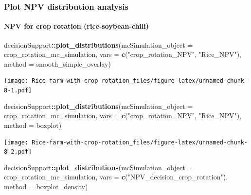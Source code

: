 \documentclass[
]{article}
\newenvironment{Shaded}{\begin{snugshade}}{\end{snugshade}}
\newcommand{\AttributeTok}[1]{\textcolor[rgb]{0.13,0.29,0.53}{#1}}
\newcommand{\FunctionTok}[1]{\textcolor[rgb]{0.13,0.29,0.53}{\textbf{#1}}}
\newcommand{\NormalTok}[1]{#1}
\newcommand{\SpecialCharTok}[1]{\textcolor[rgb]{0.81,0.36,0.00}{\textbf{#1}}}
\newcommand{\StringTok}[1]{\textcolor[rgb]{0.31,0.60,0.02}{#1}}
\begin{document}
\hypertarget{plot-npv-distribution-analysis}{%
\subsubsection{Plot NPV distribution
analysis}\label{plot-npv-distribution-analysis}}

\hypertarget{npv-for-crop-rotation-rice-soybean-chili}{%
\paragraph{NPV for crop rotation
(rice-soybean-chili)}\label{npv-for-crop-rotation-rice-soybean-chili}}

\begin{Shaded}
\begin{Highlighting}[]
\NormalTok{decisionSupport}\SpecialCharTok{::}\FunctionTok{plot\_distributions}\NormalTok{(}\AttributeTok{mcSimulation\_object =}\NormalTok{ crop\_rotation\_mc\_simulation, }
                                    \AttributeTok{vars =} \FunctionTok{c}\NormalTok{(}\StringTok{"crop\_rotation\_NPV"}\NormalTok{, }\StringTok{"Rice\_NPV"}\NormalTok{),}
                                    \AttributeTok{method =} \StringTok{\textquotesingle{}smooth\_simple\_overlay\textquotesingle{}}\NormalTok{)}
\end{Highlighting}
\end{Shaded}

\texttt{[image: Rice-farm-with-crop-rotation\_files/figure-latex/unnamed-chunk-8-1.pdf]}

\begin{Shaded}
\begin{Highlighting}[]
\NormalTok{decisionSupport}\SpecialCharTok{::}\FunctionTok{plot\_distributions}\NormalTok{(}\AttributeTok{mcSimulation\_object =}\NormalTok{ crop\_rotation\_mc\_simulation, }
                                    \AttributeTok{vars =} \FunctionTok{c}\NormalTok{(}\StringTok{"crop\_rotation\_NPV"}\NormalTok{, }\StringTok{"Rice\_NPV"}\NormalTok{),}
                                    \AttributeTok{method =} \StringTok{\textquotesingle{}boxplot\textquotesingle{}}\NormalTok{)}
\end{Highlighting}
\end{Shaded}

\texttt{[image: Rice-farm-with-crop-rotation\_files/figure-latex/unnamed-chunk-8-2.pdf]}

\begin{Shaded}
\begin{Highlighting}[]
\NormalTok{decisionSupport}\SpecialCharTok{::}\FunctionTok{plot\_distributions}\NormalTok{(}\AttributeTok{mcSimulation\_object =}\NormalTok{ crop\_rotation\_mc\_simulation, }
                                    \AttributeTok{vars =} \FunctionTok{c}\NormalTok{(}\StringTok{"NPV\_decision\_crop\_rotation"}\NormalTok{),}
                                    \AttributeTok{method =} \StringTok{\textquotesingle{}boxplot\_density\textquotesingle{}}\NormalTok{)}
\end{Highlighting}
\end{Shaded}
\end{document}
